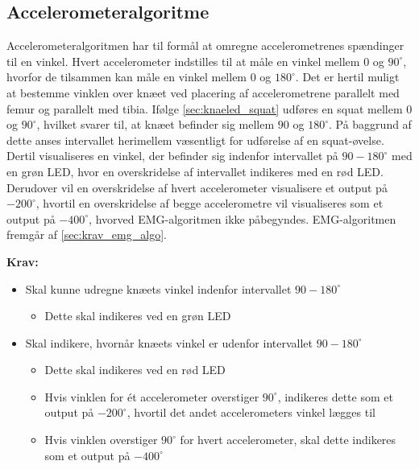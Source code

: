 \subsection{Accelerometeralgoritme}
Accelerometeralgoritmen har til formål at omregne accelerometrenes spændinger til en vinkel. 
Hvert accelerometer indstilles til at måle en vinkel mellem 0 og $90^{\circ}$, hvorfor de tilsammen kan måle en vinkel mellem 0 og $180^{\circ}$. 
Det er hertil muligt at bestemme vinklen over knæet ved placering af accelerometrene parallelt med femur og parallelt med tibia. 
Ifølge \autoref{sec:knaeled_squat} udføres en squat mellem $0$ og $90^{\circ}$, hvilket svarer til, at knæet befinder sig mellem $90$ og $180^{\circ}$. 
På baggrund af dette anses intervallet herimellem væsentligt for udførelse af en squat-øvelse. 
Dertil visualiseres en vinkel, der befinder sig indenfor intervallet på $90-180^{\circ}$ med en grøn LED, hvor en overskridelse af intervallet indikeres med en rød LED. 
Derudover vil en overskridelse af hvert accelerometer visualisere et output på $-200^{\circ}$, hvortil en overskridelse af begge accelerometre vil visualiseres som et output på $-400^{\circ}$, hvorved EMG-algoritmen ikke påbegyndes. EMG-algoritmen fremgår af \autoref{sec:krav_emg_algo}.
 
\vspace{3mm}
\textbf{Krav:}
\begin{itemize}
\item Skal kunne udregne knæets vinkel indenfor intervallet $90-180^{\circ}$
\begin{itemize}
\item Dette skal indikeres ved en grøn LED
\end{itemize}
\item Skal indikere, hvornår knæets vinkel er udenfor intervallet $90-180^{\circ}$
\begin{itemize}
\item Dette skal indikeres ved en rød LED
\item Hvis vinklen for ét accelerometer overstiger $90^{\circ}$, indikeres dette som et output på $-200^{\circ}$, hvortil det andet accelerometers vinkel lægges til
\item Hvis vinklen overstiger $90^{\circ}$ for hvert accelerometer, skal dette indikeres som et output på $-400^{\circ}$
\end{itemize}
\end{itemize}